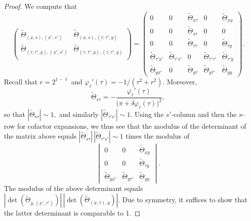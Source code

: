 \documentclass[leqno]{amsart}
\theoremstyle{definition}
\theoremstyle{remark}
\numberwithin{equation}{section}
\begin{document}
\begin{proof}
We compute that 
\[
\begin{pmatrix}
\tilde\Theta_{(\underline x,s),(\underline x',s')} & \tilde\Theta_{(\underline x,s),(\tau,\tau',y)}\\
\tilde\Theta_{(\tau,\tau',y),(\underline x',s')} & \tilde\Theta_{(\tau,\tau',y),(\tau,\tau',y)}\\
\end{pmatrix}
 = 
\begin{pmatrix}
0 & 0 & \tilde\Theta_{\underline x\tau} & 0 & \tilde\Theta_{\underline xy} \\
0 & 0 & \tilde\Theta_{s\tau} & 0 & 0 \\
0 & 0 & \tilde\Theta_{\tau\tau} & 0 & \tilde\Theta_{\tau y} \\
\tilde\Theta_{\tau'\underline x'} & \tilde\Theta_{\tau's'} & 0 & \tilde\Theta_{\tau'\tau'} & \tilde\Theta_{\tau' y} \\
\tilde\Theta_{y\underline x'} & 0 & \tilde\Theta_{y\tau} & \tilde\Theta_{y\tau'} & \tilde\Theta_{yy} 
\end{pmatrix}.
\]
Recall that $r=2^{1-\ell}$ and $\varphi_\ell'(\tau)=-1/(\tau^2+r^2)$.
Moreover,
\[
\tilde\Theta_{s\tau}
=-\frac{\varphi_\ell'(\tau)}
{\big(\pi+\delta\varphi_\ell(\tau)\big)^2},
\]
so that 
$|\tilde\Theta_{s\tau}|\sim 1,$ and similarly $|\tilde\Theta_{\tau's'}|\sim 1.$
Using the $s'$-column and then the $s$-row for cofactor expansions, we thus see that the modulus of the determinant of the matrix above equals $|\tilde\Theta_{s\tau}| \, |\tilde\Theta_{\tau's'}|\sim 1$ times the modulus of
\[
\begin{vmatrix}
0 & 0 & \tilde\Theta_{\underline xy} \\
0 & 0 & \tilde\Theta_{\tau y} \\
\tilde\Theta_{y\underline x'}& \tilde\Theta_{y\tau'} & \tilde\Theta_{yy} 
\end{vmatrix}.
\]
The modulus of the above determinant equals $|\det( \tilde\Theta_{y,(\underline x',\tau')} )| \, |\det( \tilde\Theta_{(\underline x,\tau),y} )|$. Due to symmetry, it suffices to show that the latter determinant is comparable to 1. 
\smallskip


\end{proof}
\end{document}
